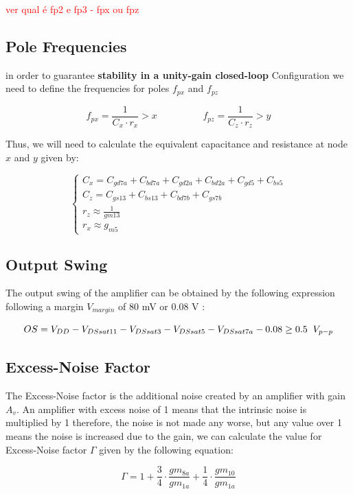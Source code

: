\textcolor{red}{ver qual é fp2 e fp3 - fpx ou fpz }

\subsection{Pole Frequencies}
in order to guarantee \textbf{stability in a unity-gain closed-loop} Configuration we need to define the frequencies
for poles $f_{px}$ and  $f_{pz}$

$$f_{px} = \frac{1}{C_x\cdot r_x} > x  \hspace{2cm}  f_{pz} = \frac{1}{C_z\cdot r_z} > y$$

Thus, we will need to calculate the equivalent capacitance and resistance at node $x$ and $y$ given by:

\begin{equation}
    \begin{cases}
        C_x = C_{gd7a} + C_{bd7a}+ C_{gd2a} + C_{bd2a} + C_{gd5} + C_{bs5}\\
        C_z = C_{gs13} + C_{bs13} + C_{bd7b}+ C_{gs7b} \\
        r_z \approx \frac{1}{gm13} \\
        r_x \approx g_{m5} 
    \end{cases}
\end{equation}

\subsection{Output Swing}
The output swing of the amplifier can be obtained by the following expression following a margin $V_{margin}$ of 80 mV or 0.08 V :

$$OS = V_{DD} - V_{DSsat11} - V_{DSsat3} - V_{DSsat5} - V_{DSsat7a} - 0.08  \geq  0.5 \hspace{0.2cm} V_{p-p}$$

\subsection{Excess-Noise Factor}
The Excess-Noise factor is the additional noise created by an amplifier with gain $A_v$. An amplifier with excess noise of 1 means that the intrinsic noise is multiplied by 1 therefore, the noise is not made any worse, but any value over 1 means the noise is increased due to the gain, we can calculate the value for Excess-Noise factor $\Gamma$ given by the following equation:

$$\Gamma = 1 + \frac{3}{4}\cdot \frac{gm_{8a}}{gm_{1a}} + \frac{1}{4}\cdot \frac{gm_{10}}{gm_{1a}}$$

